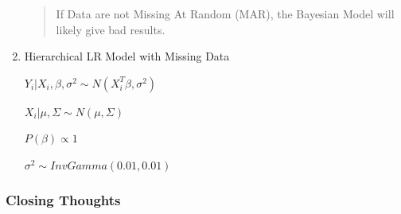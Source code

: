 \documentclass[11pt]{article}
\begin{document}
\begin{enumerate}
\begin{quote}
If Data are not Missing At Random (MAR), the Bayesian Model will likely give bad results.
\end{quote}

\item Hierarchical LR Model with Missing Data
\label{sec:orga8b4a49}

\(Y_i | X_i, \beta, \sigma^2 \sim N(X_i^T \beta, \sigma^2)\)

\(X_i | \mu, \Sigma \sim N(\mu, \Sigma)\)

\(P(\beta) \propto 1\)

\(\sigma^2 \sim InvGamma(0.01, 0.01)\)
\end{enumerate}

\subsubsection{Closing Thoughts}
\label{sec:orga05a100}
\end{document}
